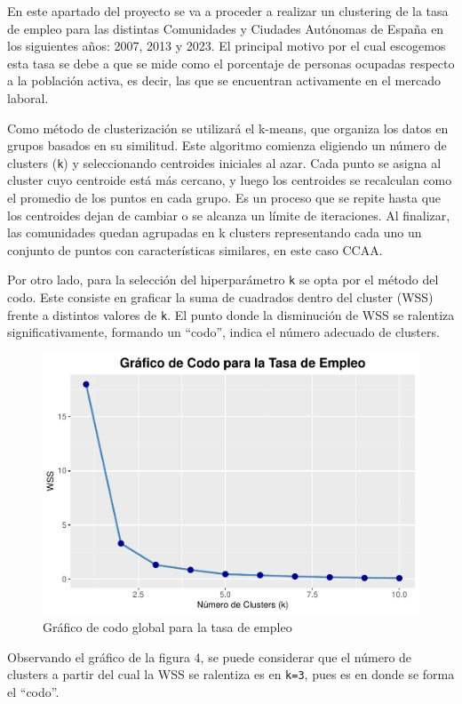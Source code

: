 \documentclass[Universitat de
València,article,submit,moreauthors,pdftex]{Definitions/mdpi}
\begin{document}
En este apartado del proyecto se va a proceder a realizar un clustering
de la tasa de empleo para las distintas Comunidades y Ciudades Autónomas
de España en los siguientes años: 2007, 2013 y 2023. El principal motivo
por el cual escogemos esta tasa se debe a que se mide como el porcentaje
de personas ocupadas respecto a la población activa, es decir, las que
se encuentran activamente en el mercado laboral.

Como método de clusterización se utilizará el k-means, que organiza los
datos en grupos basados en su similitud. Este algoritmo comienza
eligiendo un número de clusters (\texttt{k}) y seleccionando centroides
iniciales al azar. Cada punto se asigna al cluster cuyo centroide está
más cercano, y luego los centroides se recalculan como el promedio de
los puntos en cada grupo. Es un proceso que se repite hasta que los
centroides dejan de cambiar o se alcanza un límite de iteraciones. Al
finalizar, las comunidades quedan agrupadas en k clusters representando
cada uno un conjunto de puntos con características similares, en este
caso CCAA.

Por otro lado, para la selección del hiperparámetro \texttt{k} se opta
por el método del codo. Este consiste en graficar la suma de cuadrados
dentro del cluster (WSS) frente a distintos valores de \texttt{k}. El
punto donde la disminución de WSS se ralentiza significativamente,
formando un ``codo'', indica el número adecuado de clusters.\newline

\begin{figure}[h]

{\centering \includegraphics[width=0.4\linewidth]{ProyectoAED2024_files/figure-latex/unnamed-chunk-34-1} 

}

\caption{Gráfico de codo global para la tasa de empleo}\label{fig:unnamed-chunk-34}
\end{figure}

Observando el gráfico de la figura 4, se puede considerar que el número
de clusters a partir del cual la WSS se ralentiza es en \texttt{k=3},
pues es en donde se forma el ``codo''.
\end{document}
